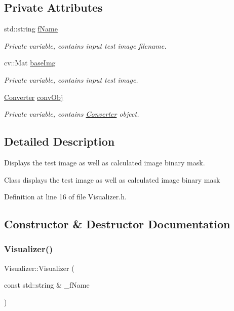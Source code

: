 \subsection*{Private Attributes}
\begin{DoxyCompactItemize}
\item 
std\+::string \mbox{\hyperlink{class_visualizer_a582bb477be7e586971f02c2c8f687179}{f\+Name}}
\begin{DoxyCompactList}\small\item\em Private variable, contains input test image filename. \end{DoxyCompactList}\item 
cv\+::\+Mat \mbox{\hyperlink{class_visualizer_a5e171a5b9a1998982fac95f07cacd610}{base\+Img}}
\begin{DoxyCompactList}\small\item\em Private variable, contains input test image. \end{DoxyCompactList}\item 
\mbox{\hyperlink{class_converter}{Converter}} \mbox{\hyperlink{class_visualizer_a0b885971fbf27caee743c7f5e9c18566}{conv\+Obj}}
\begin{DoxyCompactList}\small\item\em Private variable, contains \mbox{\hyperlink{class_converter}{Converter}} object. \end{DoxyCompactList}\end{DoxyCompactItemize}


\subsection{Detailed Description}
Displays the test image as well as calculated image binary mask. 

Class displays the test image as well as calculated image binary mask 

Definition at line 16 of file Visualizer.\+h.



\subsection{Constructor \& Destructor Documentation}
\mbox{\label{class_visualizer_a99f4d8a99e88e67c69060df5a105948e}} 
\subsubsection{\texorpdfstring{Visualizer()}{Visualizer()}}
{\footnotesize\ttfamily Visualizer\+::\+Visualizer (\begin{DoxyParamCaption}\item[{const std\+::string \&}]{\+\_\+f\+Name }\end{DoxyParamCaption})}



